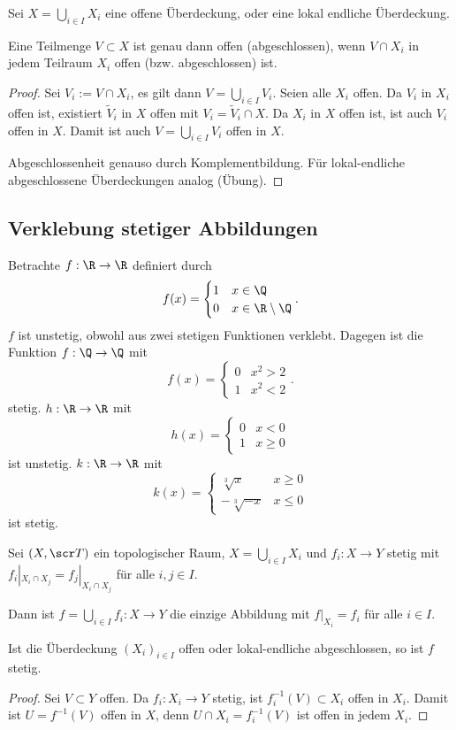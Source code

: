 \begin{st} %
	Sei $X = \bigcup_{i\in I} X_i$ eine offene Überdeckung, oder eine lokal endliche Überdeckung.

	Eine Teilmenge $V \subset X$ ist genau dann offen (abgeschlossen), wenn $V \cap X_i$ in jedem Teilraum $X_i$ offen (bzw. abgeschlossen) ist.
	\begin{proof}
		Sei $V_i := V \cap X_i$, es gilt dann $V = \bigcup_{i\in I} V_i$.
		Seien alle $X_i$ offen.
		Da $V_i$ in $X_i$ offen ist, existiert $\tilde V_i$ in $X$ offen mit $V_i = \tilde V_i \cap X$.
		Da $X_i$ in $X$ offen ist, ist auch $V_i$ offen in $X$.
		Damit ist auch $V = \bigcup_{i\in I} V_i$ offen in $X$.

		Abgeschlossenheit genauso durch Komplementbildung.
		Für lokal-endliche abgeschlossene Überdeckungen analog (Übung). %
	\end{proof}
\end{st}

\subsection{Verklebung stetiger Abbildungen}

Betrachte $f: \R \to \R$ definiert durch
\[
	f(x) = \begin{cases}
		1 & x \in \Q \\
		0 & x \in \R \setminus \Q
	\end{cases}.
\]
$f$ ist unstetig, obwohl aus zwei stetigen Funktionen verklebt.
Dagegen ist die Funktion $f: \Q \to \Q$ mit
\[
	f(x) = \begin{cases}
		0 & x^2 > 2 \\
		1 & x^2 < 2
	\end{cases}.
\]
stetig.
$h : \R \to \R$ mit
\[
	h(x) = \begin{cases}
		0 & x < 0 \\
		1 & x \ge 0
	\end{cases}
\]
ist unstetig.
$k : \R \to \R$ mit
\[
	k(x) = \begin{cases}
		\sqrt[3]{x} & x \ge 0 \\
		-\sqrt[3]{-x} & x \le 0
	\end{cases}
\]
ist stetig.

\begin{st}
	Sei $(X, \scr T)$ ein topologischer Raum, $X = \bigcup_{i \in I} X_i$ und $f_i: X \to Y$ stetig mit $f_i|_{X_i \cap X_j} = f_j|_{X_i \cap X_j}$ für alle $i,j \in I$.

	Dann ist $f = \bigcup_{i \in I} f_i : X \to Y$ die einzige Abbildung mit $f|_{X_i} = f_i$ für alle $i \in I$.

	Ist die Überdeckung $(X_i)_{i\in I}$ offen oder lokal-endliche abgeschlossen, so ist $f$ stetig.
	\begin{proof}
		Sei $V \subset Y$ offen.
		Da $f_i : X_i \to Y$ stetig, ist $f_i^{-1}(V) \subset X_i$ offen in $X_i$.
		Damit ist $U = f^{-1}(V)$ offen in $X$, denn $U \cap X_i = f_i^{-1}(V)$ ist offen in jedem $X_i$.
	\end{proof}
\end{st}

